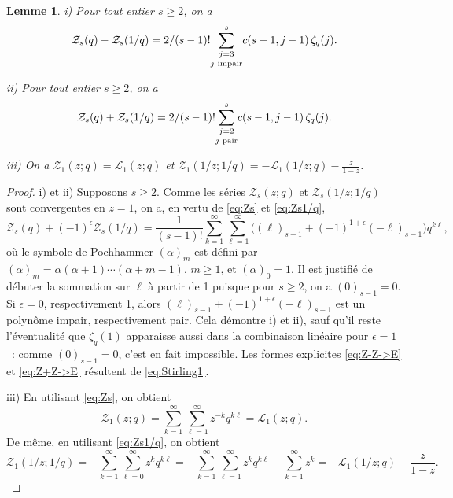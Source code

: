 \documentclass[12pt]{amsart}
\newcommand{\io}{\infty}
\newcommand{\ep}{\epsilon}
\newcommand{\dis}{\displaystyle}
\newtheorem{lem}{Lemme}
\theoremstyle{remark}
\numberwithin{equation}{section}
\begin{document}
\begin{lem}\label{lem:crucial}
{\em i)} Pour tout entier $s\ge 2$, on a 
\begin{equation} \label{eq:Z-Z->E} 
\mathcal{Z}_s(q)-\mathcal{Z}_s(1/q)=\frac {2} {(s-1)!}
\underset{j\textup{ impair}}{\sum _{j=3} ^{s}}c(s-1,j-1)\,\zeta_q(j).
\end{equation}

{\em ii)} Pour tout entier $s\ge 2$, on a 
\begin{equation} \label{eq:Z+Z->E}
\mathcal{Z}_s(q)+\mathcal{Z}_s(1/q)=\frac {2} {(s-1)!}
\underset{j\textup{ pair}}{\sum _{j=2} ^{s}}c(s-1,j-1)\,\zeta_q(j).
\end{equation}

{\em iii)} On a 
$\displaystyle \mathcal{Z}_{1}(z;q)=\mathcal{L}_{1}(z;q)$ et 
$\dis \mathcal{Z}_{1}(1/z;1/q)=-\mathcal{L}_{1}(1/z;q)-\frac{z}{1-z}$.
\end{lem}


\begin{proof}
i) et ii) Supposons $s\ge 2$. 
Comme les s{\'e}ries  $\mathcal{Z}_s(z;q)$ et $\mathcal{Z}_s(1/z;1/q)$ 
sont convergentes en $z=1$, on a, en vertu de \eqref{eq:Zs} et \eqref{eq:Zs1/q},
$$
\mathcal{Z}_s(q)+(-1)^{\ep}\mathcal{Z}_s(1/q)=\frac{1}{(s-1)!} 
\sum_{k= 1}^{\io}\sum_{\ell=1}^{\io}\bigl((\ell)_{s-1}+
(-1)^{1+\ep}
(-\ell)_{s-1}\bigr)q^{k\ell},
$$
o{\`u} le symbole de Pochhammer $(\alpha)_m$ est d{\'e}fini par
$(\alpha)_m=\alpha(\alpha+1)\cdots (\alpha+m-1)$, $m\ge1$, et $(\alpha)_0=1$. 
Il est justifi{\'e} de d{\'e}buter la sommation sur $\ell$ {\`a} partir de 1
puisque pour $s\ge2$, on a $(0)_{s-1}=0$.
Si $\ep=0$,
respectivement 1, alors 
$(\ell)_{s-1}+(-1)^{1+\ep}
(-\ell)_{s-1}$ est un polyn{\^o}me impair, respectivement pair. Cela
d{\'e}montre i) et ii), sauf qu'il reste l'{\'e}ventualit{\'e} que 
$\zeta_q(1)$ apparaisse aussi dans la combinaison
lin{\'e}aire pour $\ep=1$~: comme $(0)_{s-1}=0$, c'est en fait impossible. 
Les formes explicites \eqref{eq:Z-Z->E} et \eqref{eq:Z+Z->E} 
r{\'e}sultent de \eqref{eq:Stirling1}.

\medskip
iii) En 
utilisant \eqref{eq:Zs}, on obtient
$$
\mathcal{Z}_{1}(z;q)=
\sum_{k= 1}^{\io}\sum_{\ell=1}^{\io}z^{-k} q^{k\ell}=\mathcal{L}_{1}(z;q).
$$
De m{\^e}me, en utilisant \eqref{eq:Zs1/q}, on obtient
$$
\mathcal{Z}_{1}(1/z;1/q)=-\sum_{k= 1}^{\io}
\sum_{\ell=0}^{\io}z^{k} q^{k\ell}=
-\sum_{k=1}^{\io}\sum_{\ell=1}^{\io}z^{k} q^{k\ell}-
\sum_{k=1}^{\io}z^k=-\mathcal{L}_{1}(1/z;q)-\frac{z}{1-z}.
$$
\end{proof}
\end{document}
